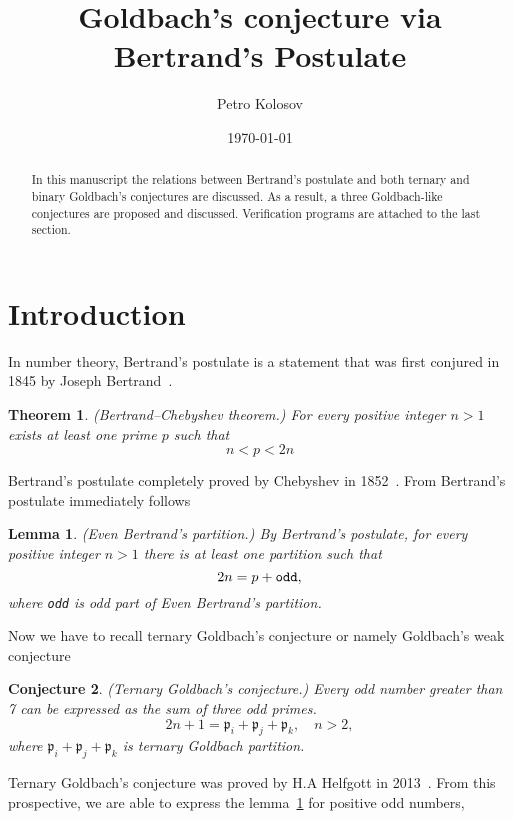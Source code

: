 \documentclass[12pt,letterpaper,oneside,reqno]{amsart}
\title[Goldbach's conjecture via Bertrand's Postulate]{Goldbach's conjecture via Bertrand's Postulate}
\author[Petro Kolosov]{Petro Kolosov}
\date{\today}
\newtheorem{thm}{Theorem}[section]
\newtheorem{lem}{Lemma}[section]
\newtheorem{conj}[thm]{Conjecture}
\begin{document}
    \begin{abstract}
        In this manuscript the relations between Bertrand's postulate and both ternary and binary Goldbach's conjectures
        are discussed.
        As a result, a three Goldbach-like conjectures are proposed and discussed.
        Verification programs are attached to the last section.
    \end{abstract}
    \maketitle


    \section{Introduction} \label{sec:introduction}
    In number theory, Bertrand's postulate is a statement that was first conjured in 1845 by
    Joseph Bertrand~\cite{bertrand1845}.
    \begin{thm}
        \label{bertrand_theorem} (Bertrand–Chebyshev theorem.)
        For every positive integer $n>1$ exists at least one prime $p$ such that
        \[
            n < p < 2n
        \]
    \end{thm}
    Bertrand's postulate completely proved by Chebyshev in 1852~\cite{Tchebichef1852}.
    From Bertrand's postulate immediately follows
    \begin{lem}
        \label{bertrands_partition_lemma} (Even Bertrand's partition.)
        By Bertrand's postulate, for every positive integer $n>1$ there is at least one partition such that
        \[
            2n = p + \verb!odd!,
        \]
        where \verb!odd! is odd part of Even Bertrand's partition.
    \end{lem}
    Now we have to recall ternary Goldbach's conjecture or namely Goldbach's weak conjecture
    \begin{conj}
        \label{ternary_goldbach_conjecture} (Ternary Goldbach's conjecture.)
        Every odd number greater than 7 can be expressed as the sum of three odd primes.
        \[
            2n+1 = \mathfrak{p}_i +  \mathfrak{p}_j + \mathfrak{p}_k, \quad n > 2,
        \]
        where $\mathfrak{p}_i +  \mathfrak{p}_j + \mathfrak{p}_k$ is ternary Goldbach partition.
    \end{conj}
    Ternary Goldbach's conjecture was proved by H.A Helfgott in 2013~\cite{helfgott2014ternary}.
    From this prospective, we are able to express the lemma~\ref{bertrands_partition_lemma} for positive odd numbers,
\end{document}
